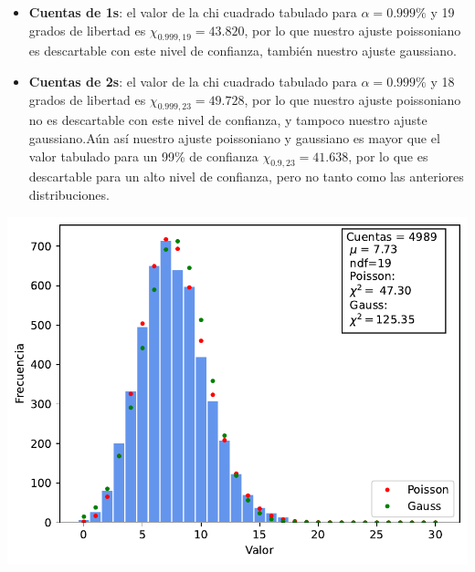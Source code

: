 \documentclass[11pt]{article}
\begin{document}
\begin{itemize}
	\item \textbf{Cuentas de 1s}: el valor de la chi cuadrado tabulado para $\alpha=0.999\%$ y 19 grados de libertad es  $\chi_{0.999,19}=43.820$, por lo que nuestro ajuste poissoniano es descartable con este nivel de confianza, también nuestro ajuste gaussiano.
	\item \textbf{Cuentas de 2s}: el valor de la chi cuadrado tabulado para $\alpha=0.999\%$ y 18 grados de libertad es  $\chi_{0.999,23}=49.728$, por lo que nuestro ajuste poissoniano no es descartable con este nivel de confianza, y tampoco nuestro ajuste gaussiano.Aún así nuestro ajuste poissoniano y gaussiano es mayor que el valor tabulado para un 99\% de confianza $\chi_{0.9,23}=41.638 $, por lo que es descartable para un alto nivel de confianza, pero no tanto como las anteriores distribuciones. 
\end{itemize}
\begin{minipage}[t]{0.5\linewidth}
	\begin{center}
	 \label{Fig:1s}
	\includegraphics[width=1\linewidth]{../Graficas/Histo_1s.pdf}
	\end{center}
\end{minipage}	
\hfill
\end{document}
